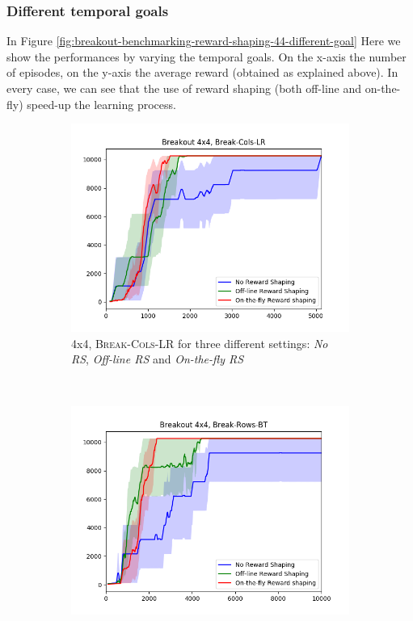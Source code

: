 \subsubsection{Different temporal goals}
In Figure \ref{fig:breakout-benchmarking-reward-shaping-44-different-goal} Here we show the performances by varying the temporal goals.
On the x-axis the number of episodes, on the y-axis the average reward (obtained as explained above). In every case, we can see that the use of reward shaping (both off-line and on-the-fly) speed-up the learning process.
\begin{figure}[h]
	\centering
	\begin{subfigure}[b]{0.65\textwidth}
		\includegraphics[width=\textwidth]{images/b44-cols-comparison}
	 	\caption{\Breakout 4x4, \textsc{Break-Cols-LR} for three different settings: \emph{No RS}, \emph{Off-line RS} and \emph{On-the-fly RS}}
		\label{fig:breakout-benchmarking-reward-shaping-44-lr-varying-goal}
	\end{subfigure}
	~ %
	\begin{subfigure}[b]{0.65\textwidth}
		\includegraphics[width=\textwidth]{images/b44-rows-comparison}

\end{subfigure}
\end{figure}
